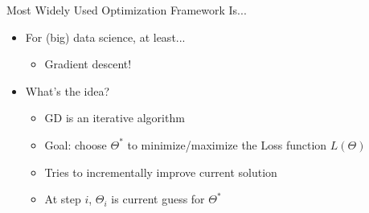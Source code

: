 \documentclass[aspectratio=169]{beamer}
\begin{document}
\begin{frame}{Most Widely Used Optimization Framework Is...}

\begin{itemize}
\item For (big) data science, at least...
	\begin{itemize}
	\item Gradient descent!
	\end{itemize}
\item What's the idea?
	\begin{itemize}
	\item GD is an iterative algorithm
	\item Goal: choose $\Theta^*$ to minimize/maximize the Loss function $L (\Theta)$
	\item Tries to incrementally improve current solution
	\item At step $i$, $\Theta_i$ is current guess for $\Theta^*$
	\end{itemize}
\end{itemize}

\end{frame}
\end{document}
